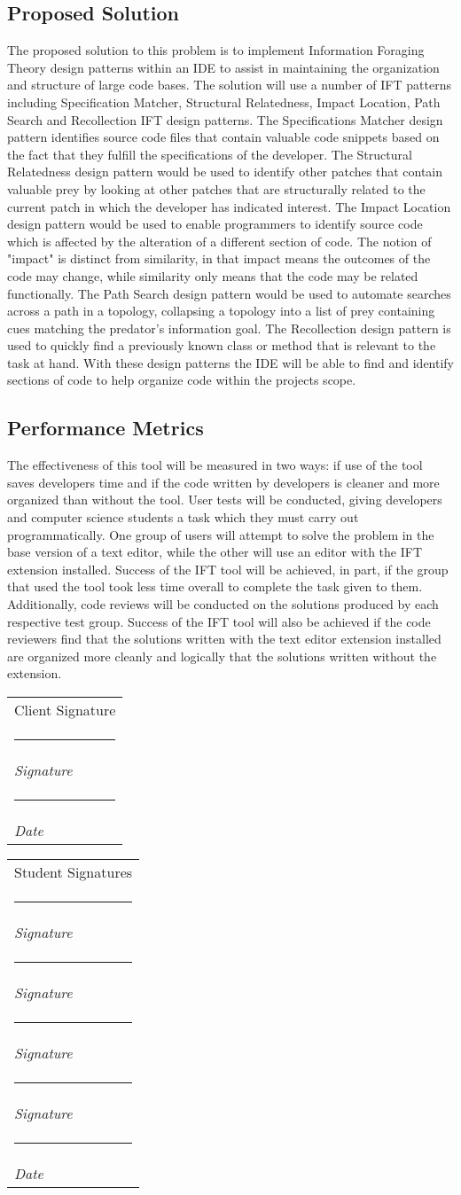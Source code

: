 \documentclass[letterpaper,10pt,titlepage,draftclsnofoot,onecolumn] {IEEEtran}
\makeatletter
\newcommand{\namesigdate}[2][4cm]{%
  \begin{tabular}{@{}p{#1}@{}}
    #2 \\[2\normalbaselineskip] \hrule \\[0pt]
    {\small \textit{Signature}} \\[2\normalbaselineskip] \hrule \\[0pt]
    {\small \textit{Date}}
  \end{tabular}
}
\newcommand{\studentnamesigdate}[2][4cm]{%
  \begin{tabular}{@{}p{#1}@{}}
    #2 \\[2\normalbaselineskip] \hrule \\[0pt]
    {\small \textit{Signature}} \\[2\normalbaselineskip] \hrule \\[0pt]
    {\small \textit{Signature}} \\[2\normalbaselineskip] \hrule \\[0pt]
    {\small \textit{Signature}} \\[2\normalbaselineskip] \hrule \\[0pt]
    {\small \textit{Signature}} \\[2\normalbaselineskip] \hrule \\[0pt]
    {\small \textit{Date}}
  \end{tabular}
}
\makeatother
\begin{document}
\bigskip
\subsection{Proposed Solution}
The proposed solution to this problem is to implement Information Foraging Theory design patterns within an IDE to assist in maintaining the organization and structure of large code bases.
The solution will use a number of IFT patterns including Specification Matcher, Structural Relatedness, Impact Location, Path Search and Recollection IFT design patterns.
The Specifications Matcher design pattern identifies source code files that contain valuable code snippets based on the fact that they fulfill the specifications of the developer. 
The Structural Relatedness design pattern would be used to identify other patches that contain valuable prey by looking at other patches that are structurally related to the current patch in which the developer has indicated interest.
The Impact Location design pattern would be used to enable programmers to identify source code which is affected by the alteration of a different section of code. 
The notion of "impact" is distinct from similarity, in that impact means the outcomes of the code may change, while similarity only means that the code may be related functionally. 
The Path Search design pattern would be used to automate searches across a path in a topology, collapsing a topology into a list of prey containing cues matching the predator's information goal. 
The Recollection design pattern is used to quickly find a previously known class or method that is relevant to the task at hand.
With these design patterns the IDE will be able to find and identify sections of code to help organize code within the projects scope. \cite{iftwiki}

\bigskip
\subsection{Performance Metrics}
The effectiveness of this tool will be measured in two ways: if use of the tool saves developers time and if the code written by developers is cleaner and more organized than without the tool. 
User tests will be conducted, giving developers and computer science students a task which they must carry out programmatically. 
One group of users will attempt to solve the problem in the base version of a text editor, while the other will use an editor with the IFT extension installed. 
Success of the IFT tool will be achieved, in part, if the group that used the tool took less time overall to complete the task given to them. 
Additionally, code reviews will be conducted on the solutions produced by each respective test group.
Success of the IFT tool will also be achieved if the code reviewers find that the solutions written with the text editor extension installed are organized more cleanly and logically that the solutions written without the extension. 




\pagebreak

\namesigdate{Client Signature} \hfill 
\studentnamesigdate[4cm]{Student Signatures}
\end{document}
